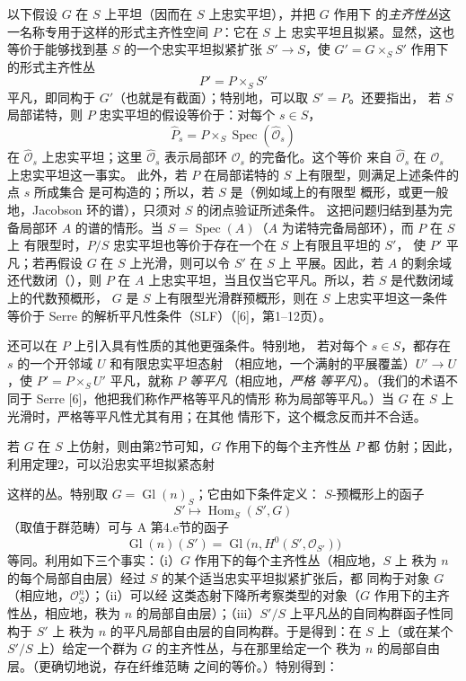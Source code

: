 以下假设 $G$ 在 $S$ 上平坦（因而在 $S$ 上忠实平坦），并把 $G$ 作用下
的\emph{主齐性丛}这一名称专用于这样的形式主齐性空间 $P$：它在 $S$ 上
忠实平坦且拟紧。显然，这也等价于能够找到基 $S$ 的一个忠实平坦拟紧扩张
$S'\longrightarrow S$，使 $G'=G\times_SS'$ 作用下的形式主齐性丛
\[
  P'=P\times_SS'
\]
平凡，即同构于 $G'$（也就是有截面）；特别地，可以取 $S'=P$。还要指出，
若 $S$ 局部诺特，则 $P$ 忠实平坦的假设等价于：对每个 $s\in S$，
\[
  \widehat P_s=P\times_S\operatorname{Spec}(\widehat{\mathcal O}_s)
\]
在 $\widehat{\mathcal O}_s$ 上忠实平坦；这里
$\widehat{\mathcal O}_s$ 表示局部环 $\mathcal O_s$ 的完备化。这个等价
来自 $\widehat{\mathcal O}_s$ 在 $\mathcal O_s$ 上忠实平坦这一事实。
此外，若 $P$ 在局部诺特的 $S$ 上有限型，则满足上述条件的点 $s$ 所成集合
是可构造的；所以，若 $S$ 是（例如域上的有限型
概形，或更一般地，Jacobson 环的谱），只须对 $S$ 的闭点验证所述条件。
这把问题归结到基为完备局部环 $A$ 的谱的情形。当
$S=\operatorname{Spec}(A)$（$A$ 为诺特完备局部环），而 $P$ 在 $S$ 上
有限型时，$P/S$ 忠实平坦也等价于存在一个在 $S$ 上有限且平坦的 $S'$，
使 $P'$ 平凡；若再假设 $G$ 在 $S$ 上光滑，则可以令 $S'$ 在 $S$ 上
平展。因此，若 $A$ 的剩余域还代数闭（），则 $P$ 在
$A$ 上忠实平坦，当且仅当它平凡。所以，若 $S$ 是代数闭域上的代数预概形，
$G$ 是 $S$ 上有限型光滑群预概形，则在 $S$ 上忠实平坦这一条件等价于
Serre 的解析平凡性条件（SLF）（[6]，第1--12页）。

还可以在 $P$ 上引入具有性质的其他更强条件。特别地，
若对每个 $s\in S$，都存在 $s$ 的一个开邻域 $U$ 和有限忠实平坦态射
（相应地，一个满射的平展覆盖）$U'\longrightarrow U$，使
$P'=P\times_SU'$ 平凡，就称 $P$ \emph{等平凡}（相应地，\emph{严格
等平凡}）。（我们的术语不同于 Serre [6]，他把我们称作严格等平凡的情形
称为局部等平凡。）当 $G$ 在 $S$ 上光滑时，严格等平凡性尤其有用；在其他
情形下，这个概念反而并不合适。

若 $G$ 在 $S$ 上仿射，则由第2节可知，$G$ 作用下的每个主齐性丛 $P$ 都
仿射；因此，利用定理2，可以沿忠实平坦拟紧态射

这样的丛。特别取 $G=\operatorname{Gl}(n)_S$；它由如下条件定义：
$S$-预概形上的函子
\[
  S'\longmapsto\operatorname{Hom}_S(S',G)
\]
（取值于群范畴）可与 A 第4.e节的函子
\[
  \operatorname{Gl}(n)(S')
  =\operatorname{Gl}\bigl(n,H^0(S',\mathcal O_{S'})\bigr)
\]
等同。利用如下三个事实：（i）$G$ 作用下的每个主齐性丛（相应地，$S$ 上
秩为 $n$ 的每个局部自由层）经过 $S$ 的某个适当忠实平坦拟紧扩张后，都
同构于对象 $G$（相应地，$\mathcal O_S^n$）；（ii）可以经
这类态射下降所考察类型的对象（$G$ 作用下的主齐性丛，相应地，秩为 $n$
的局部自由层）；（iii）$S'/S$ 上平凡丛的自同构群函子性同构于 $S'$ 上
秩为 $n$ 的平凡局部自由层的自同构群。于是得到：在 $S$
上（或在某个 $S'/S$ 上）给定一个群为 $G$ 的主齐性丛，与在那里给定一个
秩为 $n$ 的局部自由层。（更确切地说，存在纤维范畴
之间的等价。）特别得到：

